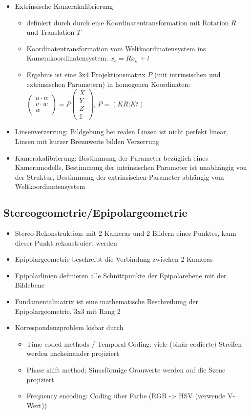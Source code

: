 \documentclass[paper=a4, fontsize=11pt]{scrartcl} %
\numberwithin{equation}{section} %
\numberwithin{figure}{section} %
\numberwithin{table}{section} %
\begin{document}
\begin{itemize}
\item Extrinsische Kamerakalibrierung
\begin{itemize}
\item definiert durch durch eine Koordinatentransformation mit Rotation $R$ und Translation $T$
\item Koordinatentransformation vom Weltkoordinatensystem ins Kamerakoordinatensystem: $x_c = Rx_w + t$
\item Ergebnis ist eine 3x4 Projektionsmatrix $P$ (mit intrinsischen und extrinsischen Parametern) in homogenen Koordinaten: $\begin{pmatrix} u \cdot w \\ v \cdot w \\ w\end{pmatrix} = P \begin{pmatrix} X \\ Y \\ Z \\ 1\end{pmatrix}$, $P = (KR|Kt)$
\end{itemize}
\item Linsenverzerrung: Bildgebung bei realen Linsen ist nicht perfekt linear, Linsen mit kurzer Brennweite bilden Verzerrung
\item Kamerakalibrierung: Bestimmung der Parameter bezüglich eines Kameramodells, Bestimmung der intrinsischen Parameter ist unabhängig von der Struktur, Bestimmung der extrinsischen Parameter abhängig vom Weltkoordinatensystem
\end{itemize}

\subsection{Stereogeometrie/Epipolargeometrie}

\begin{itemize}
\item Stereo-Rekonstruktion: mit 2 Kameras und 2 Bildern eines Punktes, kann dieser Punkt rekonstruiert werden
\item Epipolargeometrie beschreibt die Verbindung zwischen 2 Kameras
\item Epipolarlinien definieren alle Schnittpunkte der Epipolarebene mit der Bildebene
\item Fundamentalmatrix ist eine mathematische Beschreibung der Epipolargeometrie, 3x3 mit Rang 2
\item Korrespondenzproblem lösbar durch
\begin{itemize}
\item Time coded methods / Temporal Coding: viele (binär codierte) Streifen werden nacheinander projiziert
\item Phase shift method: Sinusförmige Grauwerte werden auf die Szene projiziert
\item Frequency encoding: Coding über Farbe (RGB -> HSV (verwende V-Wert))
\end{itemize}
\end{itemize}
\end{document}
